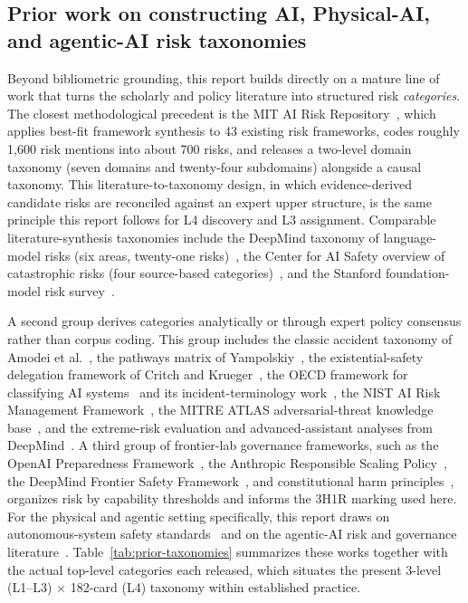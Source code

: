 \documentclass[11pt]{article}
\begin{document}
\subsection*{Prior work on constructing AI, Physical-AI, and agentic-AI risk taxonomies}

Beyond bibliometric grounding, this report builds directly on a mature line of work that turns the scholarly and policy literature into structured risk \emph{categories}. The closest methodological precedent is the MIT AI Risk Repository~\cite{slattery2024}, which applies best-fit framework synthesis to 43 existing risk frameworks, codes roughly 1{,}600 risk mentions into about 700 risks, and releases a two-level domain taxonomy (seven domains and twenty-four subdomains) alongside a causal taxonomy. This literature-to-taxonomy design, in which evidence-derived candidate risks are reconciled against an expert upper structure, is the same principle this report follows for L4 discovery and L3 assignment. Comparable literature-synthesis taxonomies include the DeepMind taxonomy of language-model risks (six areas, twenty-one risks)~\cite{weidinger2021}, the Center for AI Safety overview of catastrophic risks (four source-based categories)~\cite{hendrycks2023}, and the Stanford foundation-model risk survey~\cite{bommasani2021}.

A second group derives categories analytically or through expert policy consensus rather than corpus coding. This group includes the classic accident taxonomy of Amodei et al.~\cite{amodei2016}, the pathways matrix of Yampolskiy~\cite{yampolskiy2016}, the existential-safety delegation framework of Critch and Krueger~\cite{critch2020}, the OECD framework for classifying AI systems~\cite{oecd2022class} and its incident-terminology work~\cite{oecd2024incidents}, the NIST AI Risk Management Framework~\cite{nist-airmf}, the MITRE ATLAS adversarial-threat knowledge base~\cite{mitre-atlas}, and the extreme-risk evaluation and advanced-assistant analyses from DeepMind~\cite{shevlane2023,gabriel2024}. A third group of frontier-lab governance frameworks, such as the OpenAI Preparedness Framework~\cite{openai2025prep}, the Anthropic Responsible Scaling Policy~\cite{anthropic2024rsp}, the DeepMind Frontier Safety Framework~\cite{deepmind2025fsf}, and constitutional harm principles~\cite{bai2022}, organizes risk by capability thresholds and informs the 3H1R marking used here. For the physical and agentic setting specifically, this report draws on autonomous-system safety standards~\cite{iso21448,ul4600} and on the agentic-AI risk and governance literature~\cite{chan2023,shavit2023,chan2024,benton2024}. Table~\ref{tab:prior-taxonomies} summarizes these works together with the actual top-level categories each released, which situates the present 3-level (L1--L3) $\times$ 182-card (L4) taxonomy within established practice.
\end{document}
